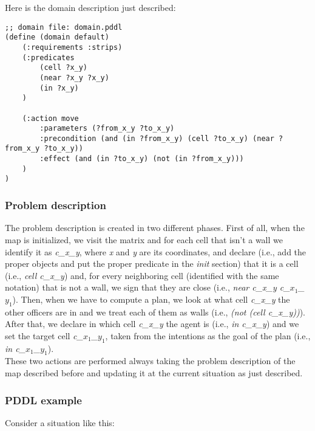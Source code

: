 \documentclass[a4paper, 11pt]{article}
\begin{document}
Here is the domain description just described:
\begin{verbatim}
;; domain file: domain.pddl
(define (domain default)
    (:requirements :strips)
    (:predicates
        (cell ?x_y)
        (near ?x_y ?x_y)
        (in ?x_y)
    )
    
    (:action move
        :parameters (?from_x_y ?to_x_y)
        :precondition (and (in ?from_x_y) (cell ?to_x_y) (near ?from_x_y ?to_x_y))
        :effect (and (in ?to_x_y) (not (in ?from_x_y)))
    )
)
\end{verbatim}

\subsubsection{Problem description}

The problem description is created in two different phases.
First of all, when the map is initialized, we visit the matrix and for each cell that isn't a wall we identify it as \emph{c\_x\_y}, where \emph{x} and \emph{y} are its coordinates, and declare (i.e., add the proper objects and put the proper predicate in the \emph{init} section) that it is a cell (i.e., \emph{cell c\_x\_y}) and, for every neighboring cell (identified with the same notation) that is not a wall, we sign that they are close (i.e., \emph{near c\_x\_y c\_\(x_1\)\_\(y_1\)}).
Then, when we have to compute a plan, we look at what cell \emph{c\_x\_y} the other officers are in and we treat each of them as walls (i.e., \emph{(not (cell c\_x\_y))}). After that, we declare in which cell \emph{c\_x\_y} the agent is (i.e., \emph{in c\_x\_y}) and we set the target cell \emph{c\_\(x_1\)\_\(y_1\)}, taken from the intentions as the goal of the plan (i.e., \emph{in c\_\(x_1\)\_\(y_1\)}).\\
These two actions are performed always taking the problem description of the map described before and updating it at the current situation as just described.

\subsubsection{PDDL example}

Consider a situation like this:
\end{document}
